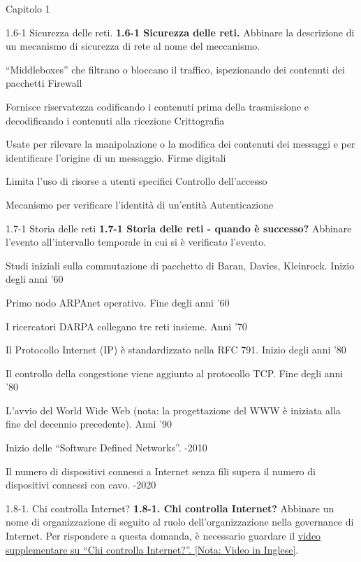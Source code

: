 \documentclass[a4paper]{article}
\begin{document}
\begin{quiz}{Capitolo 1}
\begin{matching}[points=1,shuffle=true]{1.6-1 Sicurezza delle reti.}
\textbf{1.6-1 Sicurezza delle reti.}
Abbinare la descrizione di un mecanismo di sicurezza di rete al nome del meccanismo.

\item ``Middleboxes'' che filtrano o bloccano il traffico, ispezionando dei contenuti dei pacchetti \answer Firewall
\item Fornisce riservatezza codificando i contenuti prima della trasmissione e decodificando i contenuti alla ricezione \answer Crittografia
\item Usate per rilevare la manipolazione o la modifica dei contenuti dei messaggi e per identificare l'origine di un messaggio. \answer Firme digitali
\item Limita l'uso di risorse a utenti specifici \answer Controllo dell'accesso
\item Mecanismo per verificare l'identità di un'entità \answer Autenticazione
\end{matching}

\begin{matching}[points=1]{1.7-1 Storia delle reti}
\textbf{1.7-1 Storia delle reti - quando è successo?}
Abbinare l'evento all'intervallo temporale in cui si è verificato l'evento.

\item Studi iniziali sulla commutazione di pacchetto di Baran, Davies, Kleinrock. \answer Inizio degli anni '60
\item Primo nodo ARPAnet operativo. \answer Fine degli anni '60
\item I ricercatori DARPA collegano tre reti insieme. \answer Anni '70
\item Il Protocollo Internet (IP) è standardizzato nella RFC 791. \answer Inizio degli anni '80
\item Il controllo della congestione viene aggiunto al protocollo TCP. \answer Fine degli anni '80
\item L'avvio del World Wide Web (nota: la progettazione del WWW è iniziata alla fine del decennio precedente). \answer Anni '90
\item Inizio delle ``Software Defined Networks''. -2010
\item Il numero di dispositivi connessi a Internet senza fili supera il numero di dispositivi connessi con cavo. -2020
\end{matching}

\begin{matching}[points=1,shuffle=true]{1.8-1. Chi controlla Internet?}
\textbf{1.8-1. Chi controlla Internet?}
Abbinare un nome di organizzazione di seguito al ruolo dell'organizzazione nella governance di Internet. Per rispondere a questa domanda, è necessario guardare il \href{https://www.youtube.com/watch?v=xrd4hD_9fS8}{video supplementare su ``Chi controlla Internet?''. [Nota: Video in Inglese]}.


\end{matching}
\end{quiz}
\end{document}
